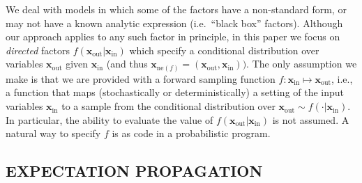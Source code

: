 \documentclass[english]{article}
\theoremstyle{plain}
\theoremstyle{plain}
\newcommand{\bx}{\mathbf{x}}				%
\newcommand{\factor}{f}				%
\newcommand{\fis}[1]{\mathrm{ne}(#1)}   	%
\newcommand{\fx}[1]{ \mathbf{x}_{\mathrm{ne}(#1)} }   	%
\newcommand{\xin}{\mathbf{x}_{ \mathrm{in} }} 			%
\newcommand{\xout}{\mathbf{x}_{ \mathrm{out} }}			%
\newcommand{\msg}[2]{m_{#1 \rightarrow #2}}			%
\newcommand{\diffd}{\mathrm{d}}
\begin{document}
We deal with models in which some of the factors have a non-standard form, or may not have a known analytic expression (i.e.\ ``black box'' factors). Although our approach applies to any such factor in principle, in this paper we focus on \textit{directed} factors $\factor(\xout | \xin)$ which specify a conditional distribution over variables $\xout$ given $\xin$ (and thus $\fx{\factor} = (\xout, \xin))$. The only assumption we make is that we are provided with a forward sampling function $f: \xin \mapsto \xout$, i.e., a function that maps (stochastically or deterministically) a setting of the input variables $\xin$ to a sample from the conditional distribution over $\xout \sim \factor(\cdot| \xin)$.
In particular, the ability to evaluate the value of $\factor(\xout | \xin)$ is not assumed.
A natural way to specify $f$ is as  code in a probabilistic program.



\subsection{EXPECTATION PROPAGATION}
\label{sec:EP:MP}

\end{document}
